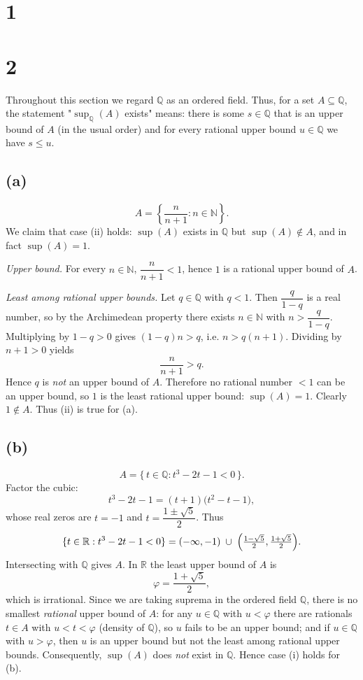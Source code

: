 \documentclass[12pt,a4paper]{article}
\theoremstyle{definition}
\theoremstyle{remark}
\begin{document}
\section*{1}



\section*{2}

Throughout this section we regard $\mathbb{Q}$ as an ordered field. Thus, for a set $A\subseteq\mathbb{Q}$, the statement "$\sup_{\mathbb{Q}}(A)$ exists" means: there is some $s\in\mathbb{Q}$ that is an upper bound of $A$ (in the usual order) and for every rational upper bound $u\in\mathbb{Q}$ we have $s\le u$.

\subsection*{(a)}
\[A 
	= \left\{\dfrac{n}{n+1} : n\in\mathbb{N}\right\}.\]
We claim that case (ii) holds: $\sup(A)$ exists in $\mathbb{Q}$ but $\sup(A)\notin A$, and in fact $\sup(A)=1$.

\emph{Upper bound.} For every $n\in\mathbb{N}$, $\dfrac{n}{n+1}<1$, hence $1$ is a rational upper bound of $A$.

\emph{Least among rational upper bounds.} Let $q\in\mathbb{Q}$ with $q<1$. Then $\dfrac{q}{1-q}$ is a real number, so by the Archimedean property there exists $n\in\mathbb{N}$ with $n>\dfrac{q}{1-q}$. Multiplying by $1-q>0$ gives $(1-q)n>q$, i.e. $n>q(n+1)$. Dividing by $n+1>0$ yields
\[
	\frac{n}{n+1} > q.
\]
Hence $q$ is \emph{not} an upper bound of $A$. Therefore no rational number $<1$ can be an upper bound, so $1$ is the least rational upper bound: $\sup(A)=1$. Clearly $1\notin A$. Thus (ii) is true for (a).

\subsection*{(b)}
\[A 
	= \{\, t\in\mathbb{Q} : t^3-2t-1<0\,\}.\]
Factor the cubic:
\[
 t^3-2t-1 = (t+1)\bigl(t^2-t-1\bigr),
\]
whose real zeros are $t=-1$ and $t=\dfrac{1\pm\sqrt{5}}{2}$. Thus
\[
 \{ t\in\mathbb{R} : t^3-2t-1<0 \} = (-\infty,-1) \;\cup\; \Bigl(\tfrac{1-\sqrt{5}}{2}, \tfrac{1+\sqrt{5}}{2}\Bigr).
\]
Intersecting with $\mathbb{Q}$ gives $A$. In $\mathbb{R}$ the least upper bound of $A$ is
\[\varphi = \frac{1+\sqrt{5}}{2},\]
which is irrational. Since we are taking suprema in the ordered field $\mathbb{Q}$, there is no smallest \emph{rational} upper bound of $A$: for any $u\in\mathbb{Q}$ with $u<\varphi$ there are rationals $t\in A$ with $u<t<\varphi$ (density of $\mathbb{Q}$), so $u$ fails to be an upper bound; and if $u\in\mathbb{Q}$ with $u>\varphi$, then $u$ is an upper bound but not the least among rational upper bounds. Consequently, $\sup(A)$ does \emph{not} exist in $\mathbb{Q}$. Hence case (i) holds for (b).
\end{document}
